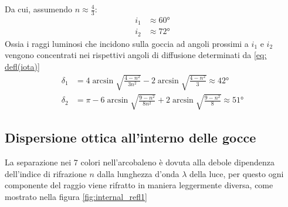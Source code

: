 \documentclass{report}[a4paper,11pt]
\begin{document}
Da cui, assumendo $n \approx \frac{4}{3}$:
\begin{align*}
i_1 &\approx 60 \si{\degree}\\
i_2 &\approx 72 \si{\degree}
\end{align*}
Ossia i raggi luminosi che incidono sulla goccia ad angoli prossimi a $i_1$ e $i_2$ vengono concentrati nei rispettivi angoli di diffusione determinati da \eqref{eq: defl(iota)}
\begin{align}
\delta_1 &= 4 \arcsin{\sqrt{\frac{4 - n^2}{3n^2}}} -2 \arcsin{\sqrt{\frac{4 - n^2}{3}}} \approx 42 \si{\degree}\\
\delta_2 &= \pi -6 \arcsin{\sqrt{\frac{9 - n^2}{8n^2}}} + 2\arcsin{\sqrt{\frac{9 - n^2}{8}}} \approx 51 \si{\degree}
\end{align}
\subsection{Dispersione ottica all'interno delle gocce}
La separazione nei $7$ colori nell'arcobaleno è dovuta alla debole dipendenza dell'indice di rifrazione $n$ dalla lunghezza d'onda $\lambda$ della luce, per questo ogni componente del raggio viene rifratto in maniera leggermente diversa, come mostrato nella figura \ref{fig:internal_refl1}
\end{document}
